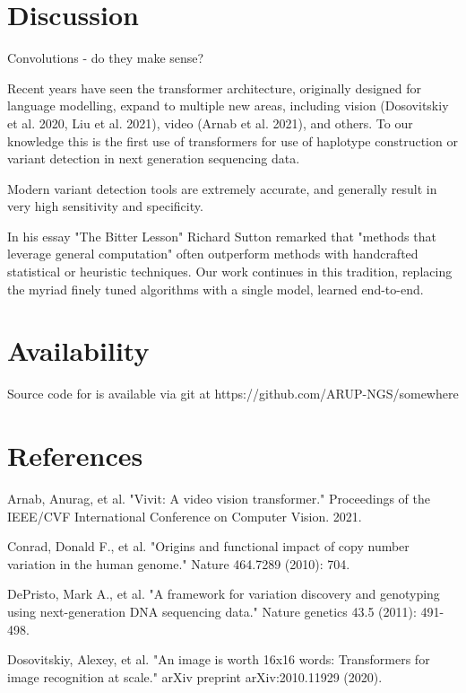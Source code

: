 \documentclass[]{article}
\begin{document}
 
 \section{Discussion}
 
 Convolutions - do they make sense? 

Recent years have seen the transformer architecture, originally designed for language modelling, expand to multiple new areas, including vision (Dosovitskiy et al. 2020, Liu et al. 2021), video (Arnab et al. 2021), and others. To our knowledge this is the first use of transformers for use of haplotype construction or variant detection in next generation sequencing data. 

Modern variant detection tools are extremely accurate, and generally result in very high sensitivity and specificity. 

 In his essay "The Bitter Lesson" Richard Sutton remarked that "methods that leverage general computation" often outperform methods with handcrafted statistical or heuristic techniques.  Our work continues in this tradition, replacing the myriad finely tuned algorithms with a single model, learned end-to-end. 
 
 \section{Availability}
 
 Source code for is available via git at https://github.com/ARUP-NGS/somewhere
 
 \section{References}
 
 \vspace{8pt}
 Arnab, Anurag, et al. "Vivit: A video vision transformer." Proceedings of the IEEE/CVF International Conference on Computer Vision. 2021.

 \vspace{8pt}
 Conrad, Donald F., et al. "Origins and functional impact of copy number variation in the human genome." Nature 464.7289 (2010): 704.
 
\vspace{8pt}
DePristo, Mark A., et al. "A framework for variation discovery and genotyping using next-generation DNA sequencing data." Nature genetics 43.5 (2011): 491-498.

\vspace{8pt}
Dosovitskiy, Alexey, et al. "An image is worth 16x16 words: Transformers for image recognition at scale." arXiv preprint arXiv:2010.11929 (2020).
\end{document}
